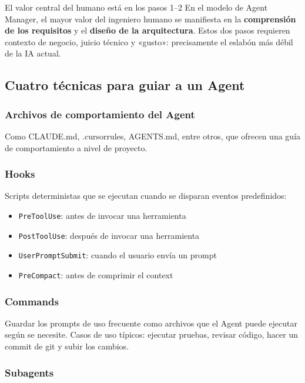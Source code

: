 \begin{knowledgebox}{El valor central del humano está en los pasos 1--2}
En el modelo de Agent Manager, el mayor valor del ingeniero humano se manifiesta en la \textbf{comprensión de los requisitos} y el \textbf{diseño de la arquitectura}. Estos dos pasos requieren contexto de negocio, juicio técnico y «gusto»: precisamente el eslabón más débil de la IA actual.
\end{knowledgebox}

\subsection{Cuatro técnicas para guiar a un Agent}

\subsubsection{Archivos de comportamiento del Agent}

Como CLAUDE.md, .cursorrules, AGENTS.md, entre otros, que ofrecen una guía de comportamiento a nivel de proyecto.

\subsubsection{Hooks}

Scripts deterministas que se ejecutan cuando se disparan eventos predefinidos:
\begin{itemize}
    \item \texttt{PreToolUse}: antes de invocar una herramienta
    \item \texttt{PostToolUse}: después de invocar una herramienta
    \item \texttt{UserPromptSubmit}: cuando el usuario envía un prompt
    \item \texttt{PreCompact}: antes de comprimir el context
\end{itemize}

\subsubsection{Commands}

Guardar los prompts de uso frecuente como archivos que el Agent puede ejecutar según se necesite. Casos de uso típicos: ejecutar pruebas, revisar código, hacer un commit de git y subir los cambios.

\subsubsection{Subagents}

